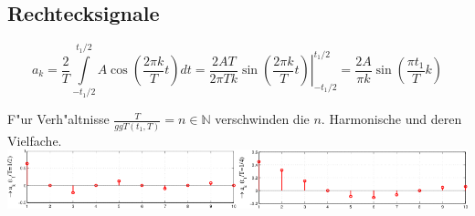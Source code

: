 	\subsection{Rechtecksignale}
	$$a_k=\frac{2}{T}\int\limits_{-t_1/2}^{t_1/2}A\cos\left(\frac{2\pi k}{T}t\right)dt=
	\left .\frac{2AT}{2\pi T k}\sin \left(\frac{2\pi k}{T}t\right)\right |_{-t_1/2}^{t_1/2}=
	\frac{2A}{\pi k}\sin\left(\frac{\pi t_1}{T}k\right)$$
	
	F"ur Verh"altnisse $\frac{T}{ggT(t_1,T)}=n\in\mathbb{N}$ verschwinden die
	$n.$ Harmonische und deren Vielfache.\\
	\includegraphics[width=19cm]{./bilder/fourierreihe-rechteck.png}
